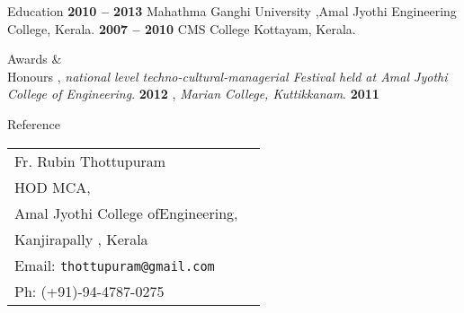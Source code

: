 \documentclass{resume}
\begin{document}

\begin{category}{Education}
   \hfill \textbf{2010 -- 2013}
  \citemnobullet Mahathma Ganghi University ,Amal Jyothi Engineering College, Kerala.
   \hfill \textbf{2007 -- 2010}
  \citemnobullet CMS College Kottayam, Kerala.
\end{category}



\begin{category}{Awards \&\\ Honours}
  , {\em national level techno-cultural-managerial Festival held at Amal Jyothi College of Engineering}. \hfill \textbf{2012}
  , {\em Marian College, Kuttikkanam}. \hfill \textbf{2011}
  
\end{category}





\begin{category}{Reference}
  \citemnobullet \\
  \begin{tabular}{ll}Fr. Rubin Thottupuram\\
    HOD MCA, \\
    Amal Jyothi College ofEngineering,\\
    Kanjirapally , Kerala\\
    Email: \mbox{\small\tt thottupuram@gmail.com}\\
    Ph: (+91)-94-4787-0275
  \end{tabular}
\end{category}
\end{document}
